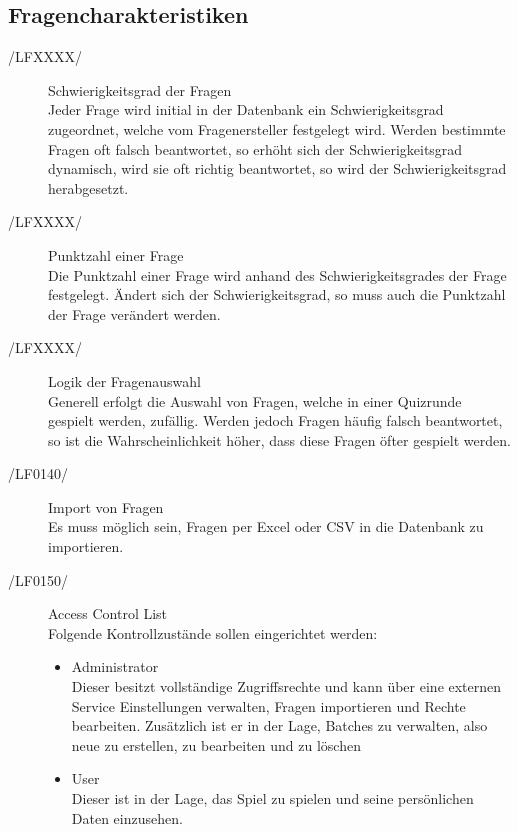 \documentclass[11pt,a4paper]{scrreprt}
\begin{document}
\subsection{Fragencharakteristiken}
\begin{description}
\item[/LFXXXX/] Schwierigkeitsgrad der Fragen \\
Jeder Frage wird initial in der Datenbank ein Schwierigkeitsgrad zugeordnet, welche vom Fragenersteller festgelegt wird. Werden bestimmte Fragen oft falsch beantwortet, so erhöht sich der Schwierigkeitsgrad dynamisch, wird sie oft richtig beantwortet, so wird der Schwierigkeitsgrad herabgesetzt.
\item[/LFXXXX/] Punktzahl einer Frage \\
Die Punktzahl einer Frage wird anhand des Schwierigkeitsgrades der Frage festgelegt. Ändert sich der Schwierigkeitsgrad, so muss auch die Punktzahl der Frage verändert werden.
\item[/LFXXXX/] Logik der Fragenauswahl \\
Generell erfolgt die Auswahl von Fragen, welche in einer Quizrunde gespielt werden, zufällig. Werden jedoch Fragen häufig falsch beantwortet, so ist die Wahrscheinlichkeit höher, dass diese Fragen öfter gespielt werden.
\item[/LF0140/] Import von Fragen \\
Es muss möglich sein, Fragen per Excel oder CSV in die Datenbank zu importieren.
\end{description}
\begin{description}
\item[/LF0150/] Access Control List \\
Folgende Kontrollzustände sollen eingerichtet werden:
	\begin{itemize}
	\item Administrator \\
	Dieser besitzt vollständige Zugriffsrechte und kann über eine externen Service Einstellungen verwalten, Fragen 				importieren und Rechte bearbeiten. Zusätzlich ist er in der Lage, Batches zu verwalten, also neue zu erstellen, zu 			bearbeiten und zu löschen
	\item User \\
	Dieser ist in der Lage, das Spiel zu spielen und seine persönlichen Daten einzusehen.
	\end{itemize}

\end{description}
\end{document}
